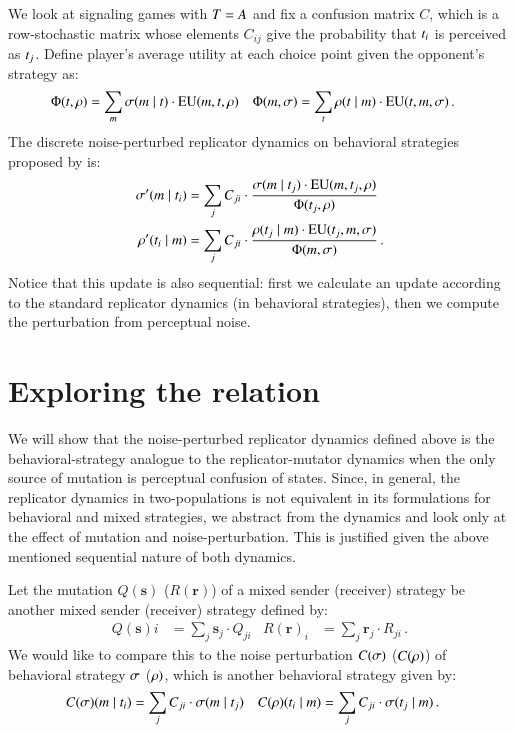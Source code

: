 \documentclass[fleqn,reqno,10pt]{article}
\renewcommand{\Smixed}{\ensuremath{\mathrm{\mathbf{s}}}}
\renewcommand{\Rmixed}{\ensuremath{\mathrm{\mathbf{r}}}}
\begin{document}
We look at signaling games with $T = A$ and fix a confusion
matrix $C$, which is a row-stochastic matrix whose elements $C_{ij}$
give the probability that $t_i$ is perceived as
$t_j$. Define player's average utility at each choice point given
the opponent's strategy as:
\begin{align*}
  \Phi(t,\rho) & = \sum_{m} \sigma(m \mid t) \cdot
\mathrm{EU}(m,t,\rho) &
\Phi(m,\sigma) & = \sum_{t} \rho(t \mid m)
\cdot \mathrm{EU}(t,m,\sigma)\,.
\end{align*}
The discrete noise-perturbed replicator dynamics on behavioral
strategies proposed by \citep{Correia2013:The-Bivalent-Tr} is:
\begin{align*}
  \sigma'(m \mid t_i) & = \sum_{j} C_{ji} \cdot
  \frac{\sigma(m \mid t_j) \cdot
    \mathrm{EU}(m,t_j,\rho)} {\Phi(t_j,\rho)} \\
    \rho'(t_i \mid m) & = \sum_{j} C_{ji} \cdot
  \frac{\rho(t_j \mid m) \cdot
    \mathrm{EU}(t_j,m,\sigma)} {\Phi(m,\sigma)}  \,.
\end{align*}
Notice that this update is also sequential: first we calculate an
update according to the standard replicator dynamics (in behavioral
strategies), then we compute the perturbation from perceptual noise.


\section{Exploring the relation}

We will show that the noise-perturbed replicator dynamics defined
above is the behavioral-strategy analogue to the replicator-mutator
dynamics when the only source of mutation is perceptual confusion of
states. Since, in general, the replicator dynamics in two-populations
is not equivalent in its formulations for behavioral and mixed
strategies, we abstract from the dynamics and look
only at the effect of mutation and noise-perturbation. This is
justified given the above mentioned sequential nature of both
dynamics.

Let the mutation $Q(\Smixed)$ ($R(\Rmixed)$) of a mixed sender
(receiver) strategy be another mixed sender (receiver) strategy
defined by:
\begin{align*}
  Q(\Smixed)i & =  \sum_j  \Smixed_j \cdot
  Q_{ji} &   R(\Rmixed)_i & =  \sum_{j}  \Rmixed_j \cdot
  R_{ji} \,.
\end{align*}
We would like to compare this to the noise perturbation $C(\sigma)$
($C(\rho)$) of behavioral strategy $\sigma$ ($\rho)$, which is
another behavioral strategy given by:
\begin{align*}
  C(\sigma)(m \mid t_i) & = \sum_{j} C_{ji} \cdot
  \sigma(m \mid t_j) & C(\rho)(t_i \mid
  m) & = \sum_{j} C_{ji} \cdot \sigma(t_j \mid m)
  \,.
\end{align*}
\end{document}
